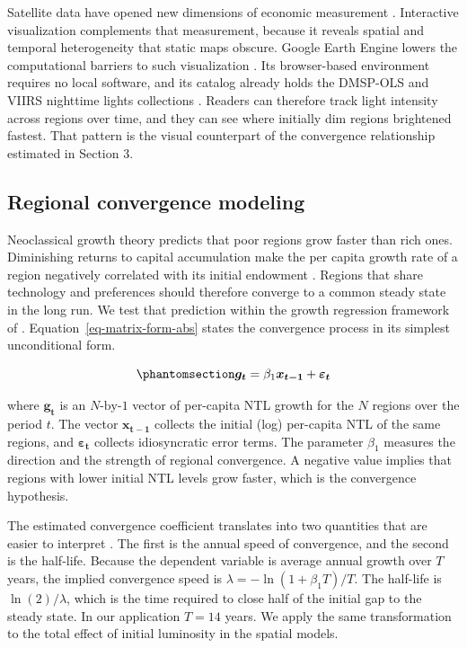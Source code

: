 \documentclass[
  a4paper, 
  twoside,
  final
]{article}
\begin{document}
Satellite data have opened new dimensions of economic measurement
\citep{donaldson_storeygard_remotesensing}. Interactive visualization
complements that measurement, because it reveals spatial and temporal
heterogeneity that static maps obscure. Google Earth Engine lowers the
computational barriers to such visualization \citep{gorelick_gee}. Its
browser-based environment requires no local software, and its catalog
already holds the DMSP-OLS and VIIRS nighttime lights collections
\citep{tamiminia_gee_review}. Readers can therefore track light
intensity across regions over time, and they can see where initially dim
regions brightened fastest. That pattern is the visual counterpart of
the convergence relationship estimated in Section 3.

\subsection{Regional convergence
modeling}\label{regional-convergence-modeling}

Neoclassical growth theory predicts that poor regions grow faster than
rich ones. Diminishing returns to capital accumulation make the per
capita growth rate of a region negatively correlated with its initial
endowment \citep{solow_growth}. Regions that share technology and
preferences should therefore converge to a common steady state in the
long run. We test that prediction within the growth regression framework
of \citet{barro_sala_convergence}. Equation~\ref{eq-matrix-form-abs}
states the convergence process in its simplest unconditional form.

\begin{equation}\phantomsection\label{eq-matrix-form-abs}{
\boldsymbol{g_t} =  \beta_1 \boldsymbol{x_{t-1}} +  \boldsymbol{\varepsilon_t}
}\end{equation}

where \(\boldsymbol{g_t}\) is an \(N\text{-by-}1\) vector of per-capita
NTL growth for the \(N\) regions over the period \(t\). The vector
\(\boldsymbol{x_{t-1}}\) collects the initial (log) per-capita NTL of
the same regions, and \(\boldsymbol{\varepsilon_t}\) collects
idiosyncratic error terms. The parameter \(\beta_1\) measures the
direction and the strength of regional convergence. A negative value
implies that regions with lower initial NTL levels grow faster, which is
the convergence hypothesis.

The estimated convergence coefficient translates into two quantities
that are easier to interpret \citep{barro_sala_convergence}. The first
is the annual speed of convergence, and the second is the half-life.
Because the dependent variable is average annual growth over \(T\)
years, the implied convergence speed is
\(\lambda = -\ln(1 + \beta_1 T)/T\). The half-life is
\(\ln(2)/\lambda\), which is the time required to close half of the
initial gap to the steady state. In our application \(T = 14\) years. We
apply the same transformation to the total effect of initial luminosity
in the spatial models.
\end{document}
